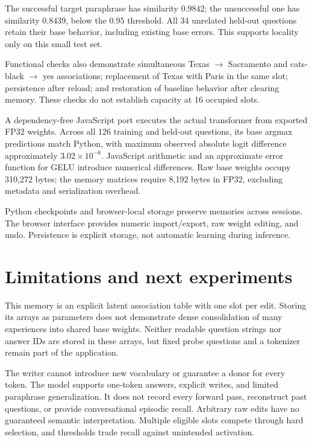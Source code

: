 \documentclass[manuscript,screen,nonacm]{acmart}
\begin{document}
The successful target paraphrase has similarity $0.9842$; the unsuccessful one has similarity $0.8439$, below the $0.95$ threshold. All 34 unrelated held-out questions retain their base behavior, including existing base errors. This supports locality only on this small test set.

Functional checks also demonstrate simultaneous Texas $\rightarrow$ Sacramento and cats-black $\rightarrow$ yes associations; replacement of Texas with Paris in the same slot; persistence after reload; and restoration of baseline behavior after clearing memory. These checks do not establish capacity at 16 occupied slots.

A dependency-free JavaScript port executes the actual transformer from exported FP32 weights. Across all 126 training and held-out questions, its base argmax predictions match Python, with maximum observed absolute logit difference approximately $3.02\times10^{-6}$. JavaScript arithmetic and an approximate error function for GELU introduce numerical differences. Raw base weights occupy 310,272 bytes; the memory matrices require 8,192 bytes in FP32, excluding metadata and serialization overhead.

Python checkpoints and browser-local storage preserve memories across sessions. The browser interface provides numeric import/export, raw weight editing, and undo. Persistence is explicit storage, not automatic learning during inference.


\section{Limitations and next experiments}
This memory is an explicit latent association table with one slot per edit. Storing its arrays as parameters does not demonstrate dense consolidation of many experiences into shared base weights. Neither readable question strings nor answer IDs are stored in these arrays, but fixed probe questions and a tokenizer remain part of the application.

The writer cannot introduce new vocabulary or guarantee a donor for every token. The model supports one-token answers, explicit writes, and limited paraphrase generalization. It does not record every forward pass, reconstruct past questions, or provide conversational episodic recall. Arbitrary raw edits have no guaranteed semantic interpretation. Multiple eligible slots compete through hard selection, and thresholds trade recall against unintended activation.
\end{document}
